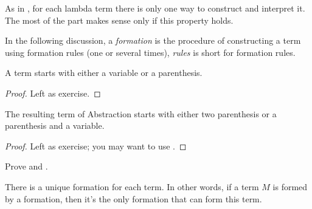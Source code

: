 \documentclass[../../../include/open-logic-section]{subfiles}
\begin{document}

As in , for each lambda term there is only one
way to construct and interpret it. The most of the part makes
sense only if this property holds.

In the following discussion, a \emph{formation} is the procedure of
constructing a term using formation rules (one or several times), \emph{rules} is short for
formation rules. 

\begin{lem}
  A term starts with either a variable or a parenthesis.
\end{lem}
\begin{proof}
  Left as exercise.
\end{proof}

\begin{lem}
  The resulting term of Abstraction starts with either two parenthesis or a
  parenthesis and a variable.
\end{lem}
\begin{proof}
  Left as exercise; you may want to use .
\end{proof}

\begin{prob}
  Prove  and .
\end{prob}

\begin{prop} 
There is a unique formation for each term. In other words, if a term
$M$ is formed by a formation, then it's the only formation that can form this term.
\end{prop}
\end{document}
